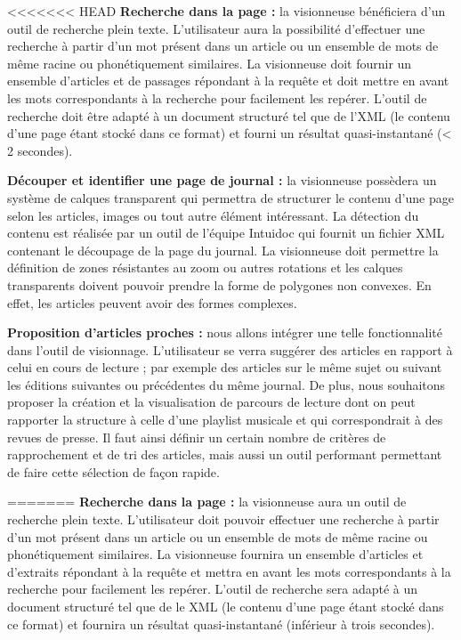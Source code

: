 <<<<<<< HEAD
    \textbf{Recherche dans la page :} la visionneuse bénéficiera d'un outil de recherche plein texte. L'utilisateur aura la possibilité
    d’effectuer une recherche à partir d’un mot présent dans un article ou un ensemble de mots de même racine ou phonétiquement similaires.
    La visionneuse doit fournir un ensemble d’articles et de passages répondant à la requête et doit mettre en avant les mots correspondants à la recherche pour facilement les repérer.
    L’outil de recherche doit être adapté à un document structuré tel que de l’XML (le contenu d’une page étant stocké dans ce format) et fourni
    un résultat quasi-instantané (< 2 secondes).


    \textbf{Découper et identifier une page de journal :} la visionneuse possèdera un système de calques transparent qui permettra de structurer le contenu d’une page selon
    les articles, images ou tout autre élément intéressant. La détection du contenu est réalisée par un outil de l’équipe Intuidoc qui fournit un
    fichier XML contenant le découpage de la page du journal. La visionneuse doit permettre la définition de zones résistantes au zoom ou autres
    rotations et les calques transparents doivent pouvoir prendre la forme de polygones non convexes. En effet, les articles peuvent avoir des formes complexes.


    \textbf{Proposition d’articles proches :} nous allons intégrer une telle fonctionnalité dans l’outil de visionnage. L'utilisateur se verra
    suggérer des articles en rapport à celui en cours de lecture ; par exemple des articles sur le même sujet ou suivant les éditions suivantes ou précédentes
    du même journal. De plus, nous souhaitons proposer la création et la visualisation de parcours de lecture dont on peut rapporter la structure
    à celle d’une playlist musicale et qui correspondrait à des revues de presse. Il faut ainsi définir un certain nombre de critères de rapprochement
    et de tri des articles, mais aussi un outil performant permettant de faire cette sélection de façon rapide.

=======
    \textbf{Recherche dans la page :} la visionneuse aura un outil de recherche plein texte. L'utilisateur doit pouvoir effectuer une recherche à partir d’un mot présent dans un article ou un ensemble de mots de même racine ou phonétiquement similaires.
    La visionneuse fournira un ensemble d’articles et d'extraits répondant à la requête et mettra en avant les mots correspondants à la recherche pour facilement les repérer.
    L’outil de recherche sera adapté à un document structuré tel que de le XML (le contenu d’une page étant stocké dans ce format) et fournira
    un résultat quasi-instantané (inférieur à trois secondes).


